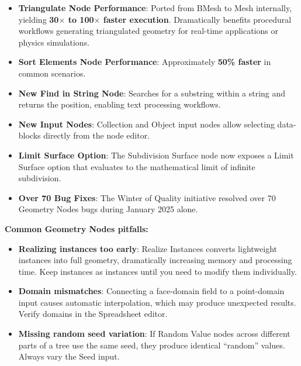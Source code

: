 \begin{itemize}[leftmargin=2em]
  \item \textbf{Triangulate Node Performance}: Ported from BMesh to Mesh internally, yielding \textbf{30$\times$ to 100$\times$ faster execution}. Dramatically benefits procedural workflows generating triangulated geometry for real-time applications or physics simulations.
  \item \textbf{Sort Elements Node Performance}: Approximately \textbf{50\% faster} in common scenarios.
  \item \textbf{New Find in String Node}: Searches for a substring within a string and returns the position, enabling text processing workflows.
  \item \textbf{New Input Nodes}: Collection and Object input nodes allow selecting data-blocks directly from the node editor.
  \item \textbf{Limit Surface Option}: The Subdivision Surface node now exposes a Limit Surface option that evaluates to the mathematical limit of infinite subdivision.
  \item \textbf{Over 70 Bug Fixes}: The Winter of Quality initiative resolved over 70 Geometry Nodes bugs during January 2025 alone.
\end{itemize}

\begin{warningbox}
\textbf{Common Geometry Nodes pitfalls:}
\begin{itemize}[leftmargin=1em]
  \item \textbf{Realizing instances too early}: Realize Instances converts lightweight instances into full geometry, dramatically increasing memory and processing time. Keep instances as instances until you need to modify them individually.
  \item \textbf{Domain mismatches}: Connecting a face-domain field to a point-domain input causes automatic interpolation, which may produce unexpected results. Verify domains in the Spreadsheet editor.
  \item \textbf{Missing random seed variation}: If Random Value nodes across different parts of a tree use the same seed, they produce identical ``random'' values. Always vary the Seed input.
\end{itemize}
\end{warningbox}



